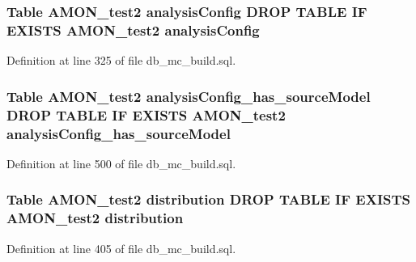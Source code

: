 \hypertarget{db__mc__build_8sql_ae935767c851325d9d634e03377c6239c}{
\subsubsection[{analysis\-Config}]{\setlength{\rightskip}{0pt plus 5cm}Table {\bf A\-M\-O\-N\-\_\-test2} analysis\-Config D\-R\-O\-P T\-A\-B\-L\-E I\-F E\-X\-I\-S\-T\-S {\bf A\-M\-O\-N\-\_\-test2} analysis\-Config}}\label{db__mc__build_8sql_ae935767c851325d9d634e03377c6239c}


Definition at line 325 of file db\-\_\-mc\-\_\-build.\-sql.

\hypertarget{db__mc__build_8sql_a86a1d4103054b5def2a754b42156e90f}{
\subsubsection[{analysis\-Config\-\_\-has\-\_\-source\-Model}]{\setlength{\rightskip}{0pt plus 5cm}Table {\bf A\-M\-O\-N\-\_\-test2} analysis\-Config\-\_\-has\-\_\-source\-Model D\-R\-O\-P T\-A\-B\-L\-E I\-F E\-X\-I\-S\-T\-S {\bf A\-M\-O\-N\-\_\-test2} analysis\-Config\-\_\-has\-\_\-source\-Model}}\label{db__mc__build_8sql_a86a1d4103054b5def2a754b42156e90f}


Definition at line 500 of file db\-\_\-mc\-\_\-build.\-sql.

\hypertarget{db__mc__build_8sql_a1afd0620c93835c58beb36aa90a68d92}{
\subsubsection[{distribution}]{\setlength{\rightskip}{0pt plus 5cm}Table {\bf A\-M\-O\-N\-\_\-test2} distribution D\-R\-O\-P T\-A\-B\-L\-E I\-F E\-X\-I\-S\-T\-S {\bf A\-M\-O\-N\-\_\-test2} distribution}}\label{db__mc__build_8sql_a1afd0620c93835c58beb36aa90a68d92}


Definition at line 405 of file db\-\_\-mc\-\_\-build.\-sql.

